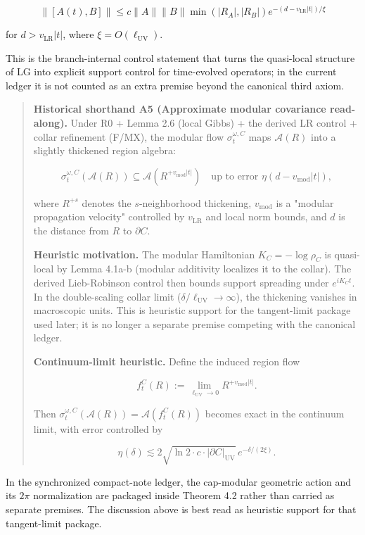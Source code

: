\[
\|[A(t), B]\| \le c \|A\| \|B\| \min(|R_A|, |R_B|) e^{-(d - v_{\mathrm{LR}}|t|)/\xi}
\]

for \(d > v_{\mathrm{LR}}|t|\), where \(\xi = O(\ell_{\mathrm{UV}})\).

This is the branch-internal control statement that turns the quasi-local structure of LG into explicit support control for time-evolved operators; in the current ledger it is not counted as an extra premise beyond the canonical third axiom.

\begin{quote}
\textbf{Historical shorthand A5 (Approximate modular covariance read-along).} Under R0 + Lemma 2.6 (local Gibbs) + the derived LR control + collar refinement (F/MX), the modular flow \(\sigma_t^{\omega,C}\) maps \(\mathcal{A}(R)\) into a slightly thickened region algebra:

\[
\sigma_t^{\omega,C}(\mathcal{A}(R)) \subseteq \mathcal{A}(R^{+v_{\mathrm{mod}}|t|})
\quad \text{up to error } \eta(d - v_{\mathrm{mod}}|t|),
\]

where \(R^{+s}\) denotes the \(s\)-neighborhood thickening, \(v_{\mathrm{mod}}\) is a "modular propagation velocity" controlled by \(v_{\mathrm{LR}}\) and local norm bounds, and \(d\) is the distance from \(R\) to \(\partial C\).

\textbf{Heuristic motivation.} The modular Hamiltonian \(K_C = -\log \rho_C\) is quasi-local by Lemma 4.1a-b (modular additivity localizes it to the collar). The derived Lieb-Robinson control then bounds support spreading under \(e^{iK_C t}\). In the double-scaling collar limit (\(\delta/\ell_{\mathrm{UV}} \to \infty\)), the thickening vanishes in macroscopic units. This is heuristic support for the tangent-limit package used later; it is no longer a separate premise competing with the canonical ledger.

\textbf{Continuum-limit heuristic.} Define the induced region flow

\[
f_t^C(R) := \lim_{\ell_{\mathrm{UV}} \to 0} R^{+v_{\mathrm{mod}}|t|}.
\]

Then \(\sigma_t^{\omega,C}(\mathcal{A}(R)) = \mathcal{A}(f_t^C(R))\) becomes exact in the continuum limit, with error controlled by

\[
\eta(\delta) \lesssim 2\sqrt{\ln 2 \cdot c \cdot |\partial C|_{\mathrm{UV}}} \, e^{-\delta/(2\xi)}.
\]
\end{quote}

In the synchronized compact-note ledger, the cap-modular geometric action and its \(2\pi\) normalization are packaged inside Theorem 4.2 rather than carried as separate premises. The discussion above is best read as heuristic support for that tangent-limit package.

